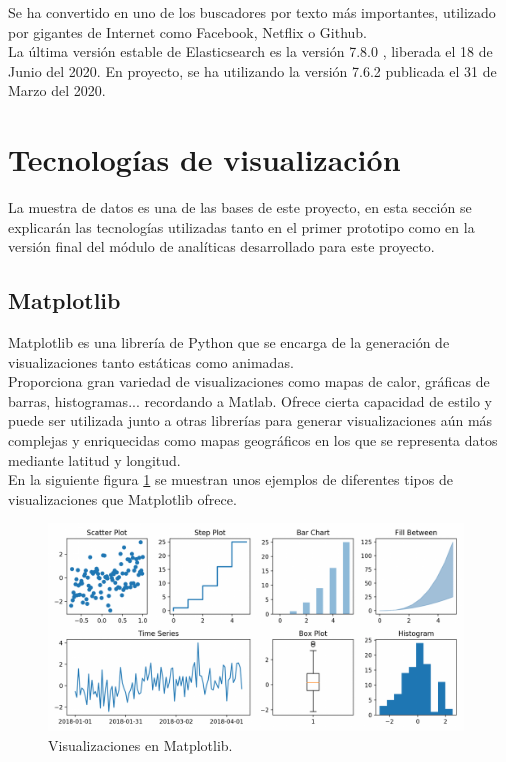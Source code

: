 \documentclass[a4paper, 12pt]{book}
\begin{document}
		Se ha convertido en uno de los buscadores por texto más importantes, utilizado por gigantes de Internet como Facebook, Netflix o Github. \\
		
		La última versión estable de Elasticsearch es la versión 7.8.0 \cite{versions_elasticsearch}, liberada el 18 de Junio del 2020. En proyecto, se ha utilizando la versión 7.6.2 publicada el 31 de Marzo del 2020.
		
	
	\section{Tecnologías de visualización} 
	\label{sec:tecnologias_visualizacion} 
		La muestra de datos es una de las bases de este proyecto, en esta sección se explicarán las tecnologías utilizadas tanto en el primer prototipo como en la versión final del módulo de analíticas desarrollado para este proyecto.
		
	\subsection{Matplotlib}
	\label{subsec:matplotlib}
		Matplotlib es una librería de Python que se encarga de la generación de visualizaciones tanto estáticas como animadas. \\
		
		Proporciona gran variedad de visualizaciones como mapas de calor, gráficas de barras, histogramas... recordando a Matlab. Ofrece cierta capacidad de estilo y puede ser utilizada junto a otras librerías para generar visualizaciones aún más complejas y enriquecidas como mapas geográficos en los que se representa datos mediante latitud y longitud. \\
		
		En la siguiente figura \ref{fig:visualizations_matplotlib} se muestran unos ejemplos de diferentes tipos de visualizaciones que Matplotlib ofrece.
		\begin{figure}[H]
			\centering
			\includegraphics[width=11cm, keepaspectratio]{img/visualizations_matplotlib.png}
			\caption{Visualizaciones en Matplotlib.}
			\label{fig:visualizations_matplotlib}
		\end{figure}
		
\end{document}

